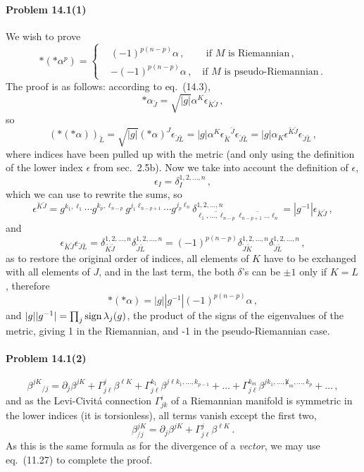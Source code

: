 \documentclass[a4paper,12pt]{article}
\newcommand{\problem}[1]{\paragraph{Problem #1}}
\begin{document}
\problem{14.1(1)} We wish to prove
\[
 *(*\alpha^p) = \left\{ \begin{aligned} &(-1)^{p(n-p)} \alpha\,,\quad\quad\,\text{if $M$ is Riemannian}\,,\\
                         &-(-1)^{p(n-p)}\alpha\,,\quad\text{if $M$ is pseudo-Riemannian}\,.
                        \end{aligned}\right.
\]
The proof is as follows: according to eq.\ (14.3),
\[
 *\alpha_{\underrightarrow{J}}=\sqrt{|g|}\alpha^K\epsilon_{\underrightarrow{K}\underrightarrow{J}}\,,
\]
so
\[
 (*(*\alpha))_{\underrightarrow{L}} = \sqrt{|g|}(*\alpha)^J \epsilon_{\underrightarrow{J}\underrightarrow{L}} = |g| \alpha^K \epsilon_{\underrightarrow{K}}{}^{\underrightarrow{J}}\epsilon_{\underrightarrow{J}\underrightarrow{L}} = |g| \alpha_K \epsilon^{\underrightarrow{K}\underrightarrow{J}}\epsilon_{\underrightarrow{J}\underrightarrow{L}}\,,
\]
where indices have been pulled up with the metric (and only using the definition of the lower index $\epsilon$ from sec.\ 2.5b). Now we take into account the definition of $\epsilon$,
\[
 \epsilon_I = \delta_I^{1,2,\dots, n}\,,
\]
which we can use to rewrite the sums, so
\[
 \epsilon^{\underrightarrow{K}\underrightarrow{J}} = g^{k_1,\ell_1}\cdots g^{k_p,\ell_{n-p}}g^{j_1 \ell_{n-p+1}}\cdots g^{j_p\ell_n}\delta^{1,2,\dots,n}_{\underrightarrow{\ell_1,\dots,\ell_{n-p}}\underrightarrow{\ell_{n-p+1}\dots\ell_n}} = |g^{-1}|\epsilon_{\underrightarrow{K}\underrightarrow{J}}\,,
\]
and
\[
 \epsilon_{\underrightarrow{K}\underrightarrow{J}}\epsilon_{\underrightarrow{J}\underrightarrow{L}} = \delta^{1,2,\dots,n}_{\underrightarrow{K}\underrightarrow{J}}\delta^{1,2,\dots,n}_{\underrightarrow{J}\underrightarrow{L}} = (-1)^{p(n-p)} \delta^{1,2,\dots,n}_{\underrightarrow{J}\underrightarrow{K}}\delta^{1,2,\dots,n}_{\underrightarrow{J}\underrightarrow{L}}\,,
\]
as to restore the original order of indices, all elements of $K$ have to be exchanged with all elements of $J$, and in the last term, the both $\delta$'s can be $\pm1$ only if $K=L$,
therefore
\[
 *(*\alpha) = |g||g^{-1}| (-1)^{p(n-p)}\alpha\,,
\]
and $|g||g^{-1}| = \prod_j \mathop{\rm sign}\lambda_j(g)$, the product of the signs of the eigenvalues of the metric, giving 1 in the Riemannian, and -1 in the pseudo-Riemannian case.


\problem{14.1(2)}
\[
 \beta^{jK}{}_{/j} = \partial_j \beta^{jK} + \Gamma^j_{j\ell}\beta^{\ell K} + \Gamma^{k_1}_{j\ell}\beta^{j\ell k_1,\dots,k_{p-1}} + \dots + \Gamma^{k_m}_{j\ell}\beta^{jk_1,\dots,\not k_m,\dots,k_p}+\dots\,,
\]
and as the Levi-Civitá connection $\Gamma^i_{jk}$ of a Riemannian manifold is symmetric in the lower indices (it is torsionless), all terms vanish except the first two,
\[
 \beta^{jK}_{/j} = \partial_j \beta^{jK}+ \Gamma^j_{j\ell}\beta^{\ell K}\,.
\]
As this is the same formula as for the divergence of a {\sl vector}, we may use eq.\ (11.27) to complete the proof.
\end{document}
